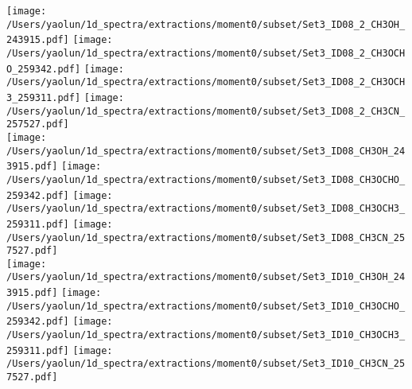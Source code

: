\addtocounter{figure}{-1}
\begin{figure*}[htbp!]
  \centering
  \texttt{[image: /Users/yaolun/1d\_spectra/extractions/moment0/subset/Set3\_ID08\_2\_CH3OH\_243915.pdf]}
  \texttt{[image: /Users/yaolun/1d\_spectra/extractions/moment0/subset/Set3\_ID08\_2\_CH3OCHO\_259342.pdf]}
  \texttt{[image: /Users/yaolun/1d\_spectra/extractions/moment0/subset/Set3\_ID08\_2\_CH3OCH3\_259311.pdf]}
  \texttt{[image: /Users/yaolun/1d\_spectra/extractions/moment0/subset/Set3\_ID08\_2\_CH3CN\_257527.pdf]}
  \\
  \texttt{[image: /Users/yaolun/1d\_spectra/extractions/moment0/subset/Set3\_ID08\_CH3OH\_243915.pdf]}
  \texttt{[image: /Users/yaolun/1d\_spectra/extractions/moment0/subset/Set3\_ID08\_CH3OCHO\_259342.pdf]}
  \texttt{[image: /Users/yaolun/1d\_spectra/extractions/moment0/subset/Set3\_ID08\_CH3OCH3\_259311.pdf]}
  \texttt{[image: /Users/yaolun/1d\_spectra/extractions/moment0/subset/Set3\_ID08\_CH3CN\_257527.pdf]}
  \\
  \texttt{[image: /Users/yaolun/1d\_spectra/extractions/moment0/subset/Set3\_ID10\_CH3OH\_243915.pdf]}
  \texttt{[image: /Users/yaolun/1d\_spectra/extractions/moment0/subset/Set3\_ID10\_CH3OCHO\_259342.pdf]}
  \texttt{[image: /Users/yaolun/1d\_spectra/extractions/moment0/subset/Set3\_ID10\_CH3OCH3\_259311.pdf]}
  \texttt{[image: /Users/yaolun/1d\_spectra/extractions/moment0/subset/Set3\_ID10\_CH3CN\_257527.pdf]}
  \\
  \caption{}
\end{figure*}
\renewcommand{\thefigure}{\arabic{figure}}